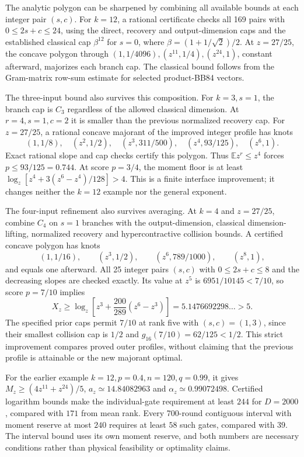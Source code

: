 \documentclass[11pt,a4paper]{article}
\newcommand{\E}{\mathbb E}
\begin{document}
The analytic polygon can be sharpened by combining all available bounds at each integer pair $(s,c)$. For $k=12$, a rational certificate checks all 169 pairs with $0\le2s+c\le24$, using the direct, recovery and output-dimension caps and the established classical cap $\beta^{12}$ for $s=0$, where $\beta=(1+1/\sqrt2)/2$. At $z=27/25$, the concave polygon through $(1,1/4096),(z^{11},1/4),(z^{24},1)$, constant afterward, majorizes each branch cap. The classical bound follows from the Gram-matrix row-sum estimate for selected product-BB84 vectors.

The three-input bound also survives this composition. For $k=3,s=1$, the branch cap is $C_3$ regardless of the allowed classical dimension. At $r=4,s=1,c=2$ it is smaller than the previous normalized recovery cap. For $z=27/25$, a rational concave majorant of the improved integer profile has knots
\[
(1,1/8),\quad(z^2,1/2),\quad(z^3,311/500),\quad
(z^4,93/125),\quad(z^6,1).
\]
Exact rational slope and cap checks certify this polygon. Thus $\E z^r\le z^4$ forces $p\le93/125=0.744$. At score $p=3/4$, the moment floor is at least $\log_z[z^4+3(z^6-z^4)/128]>4$. This is a finite interface improvement; it changes neither the $k=12$ example nor the general exponent.

The four-input refinement also survives averaging. At $k=4$ and $z=27/25$, combine $C_4$ on $s=1$ branches with the output-dimension, classical dimension-lifting, normalized recovery and hypercontractive collision bounds. A certified concave polygon has knots
\[
(1,1/16),\qquad(z^3,1/2),\qquad(z^6,789/1000),\qquad(z^8,1),
\]
and equals one afterward. All 25 integer pairs $(s,c)$ with $0\le2s+c\le8$ and the decreasing slopes are checked exactly. Its value at $z^5$ is $6951/10145<7/10$, so score $p=7/10$ implies
\[
X_z\ge\log_z\!\left[z^3+\frac{200}{289}(z^6-z^3)\right]
=5.1476692298\ldots>5.
\]
The specified prior caps permit $7/10$ at rank five with $(s,c)=(1,3)$, since their smallest collision cap is $1/2$ and $g_{16}(7/10)=62/125<1/2$. This strict improvement compares proved outer profiles, without claiming that the previous profile is attainable or the new majorant optimal.

For the earlier example $k=12,p=0.4,n=120,q=0.99$, it gives $M_z\ge(4z^{11}+z^{24})/5$, $a_z\simeq14.84082963$ and $\alpha_z\simeq0.99072498$. Certified logarithm bounds make the individual-gate requirement at least $244$ for $D=2000$, compared with $171$ from mean rank. Every 700-round contiguous interval with moment reserve at most $240$ requires at least $58$ such gates, compared with $39$. The interval bound uses its own moment reserve, and both numbers are necessary conditions rather than physical feasibility or optimality claims.
\end{document}
